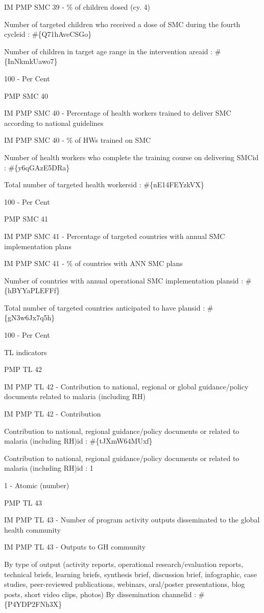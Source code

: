 \documentclass[]{book}
\begin{document}
IM PMP SMC 39 - \% of children dosed (cy. 4)

Number of targeted children who received a dose of SMC during the fourth cycleid : \#\{Q71hAveCSGo\}

Number of children in target age range in the intervention areaid : \#\{InNkmkUawo7\}

100 - Per Cent

PMP SMC 40

IM PMP SMC 40 - Percentage of health workers trained to deliver SMC according to national guidelines

IM PMP SMC 40 - \% of HWs trained on SMC

Number of health workers who complete the training course on delivering SMCid : \#\{y6qGAzE5DRa\}

Total number of targeted health workersid : \#\{nE14FEYzkVX\}

100 - Per Cent

PMP SMC 41

IM PMP SMC 41 - Percentage of targeted countries with annual SMC implementation plans

IM PMP SMC 41 - \% of countries with ANN SMC plans

Number of countries with annual operational SMC implementation plansid : \#\{hBYYaPLEFFf\}

Total number of targeted countries anticipated to have plansid : \#\{gN3w6Jx7q5h\}

100 - Per Cent

TL indicators

PMP TL 42

IM PMP TL 42 - Contribution to national, regional or global guidance/policy documents related to malaria (including RH)

IM PMP TL 42 - Contribution

Contribution to national, regional guidance/policy documents or related to malaria (including RH)id : \#\{tJXmW64MUxf\}

Contribution to national, regional guidance/policy documents or related to malaria (including RH)id : 1

1 - Atomic (number)

PMP TL 43

IM PMP TL 43 - Number of program activity outputs disseminated to the global health community

IM PMP TL 43 - Outputs to GH community

By type of output (activity reports, operational research/evaluation reports, technical briefs, learning briefs, synthesis brief, discussion brief, infographic, case studies, peer-reviewed publications, webinars, oral/poster presentations, blog posts, short video clips, photos) By dissemination channelid : \#\{P4YDP2FNh3X\}
\end{document}
